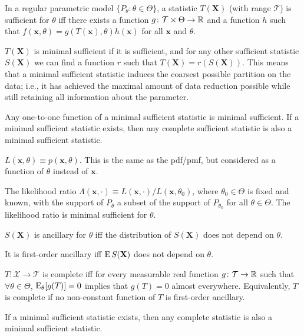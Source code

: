 \documentclass[8pt,letterpaper, landscape]{extarticle} %
\newcommand{\mX}{\ensuremath{\mathbf{X}}}
\newcommand{\mx}{\ensuremath{\mathbf{x}}}
\begin{document}
\begin{multicols}{3}
\begin{description}
 In a regular parametric model $ \{P_\theta \colon \theta \in \Theta \} $, a statistic $ T(\mX) $ (with range $ \mathcal{T} $) is sufficient for $ \theta $ iff there exists a function $ g \colon \mathcal{T} \times \Theta \to \mathbb{R} $ and a function $ h $ such that $ f(\mx, \theta ) = g(T(\mx), \theta) h(\mx) $ for all $ \mx $ and $ \theta $.

 $ T(\mX) $ is minimal sufficient if it is sufficient, and for any other sufficient statistic $ S(\mX) $ we can find a function $ r $ such that $ T(\mX) = r(S(\mX)) $. This means that a minimal sufficient statistic induces the coarsest possible partition on the data; i.e., it has achieved the maximal amount of data reduction possible while still retaining all information about the parameter.

Any one-to-one function of a minimal sufficient statistic is minimal sufficient. If a minimal sufficient statistic exists, then any complete sufficient statistic is also a minimal sufficient statistic.

 $ L(\mx, \theta) \equiv p(\mx, \theta) $. This is the same as the pdf/pmf, but considered as a function of $ \theta $ instead of $ \mx $.

The likelihood ratio $ \Lambda(\mx, \cdot) \equiv L(\mx, \cdot) / L(\mx, \theta_0) $, where $ \theta_0 \in \Theta $ is fixed and known, with the support of $ P_\theta $ a subset of the support of $ P_{\theta_0} $ for all $ \theta \in \Theta $. The likelihood ratio is minimal sufficient for $ \theta $.

 $ S(\mX) $ is ancillary for $ \theta $ iff the distribution of $ S(\mX) $ does not depend on $ \theta $.

It is first-order ancillary iff $ \E S(\mX) $ does not depend on $ \theta $.

 $ T \colon \mathcal{X} \to \mathcal{T} $ is complete iff for every measurable real function $ g \colon \mathcal{T} \to \mathbb{R} $ such that $ \forall \theta \in \Theta $, $ \operatorname{E}_\theta [g(T)] = 0 $ implies that $ g(T) = 0 $ almost everywhere. Equivalently, $ T $ is complete if no non-constant function of $ T $ is first-order ancillary.

If a minimal sufficient statistic exists, then any complete statistic is also a minimal sufficient statistic.


\end{description}
\end{multicols}
\end{document}
